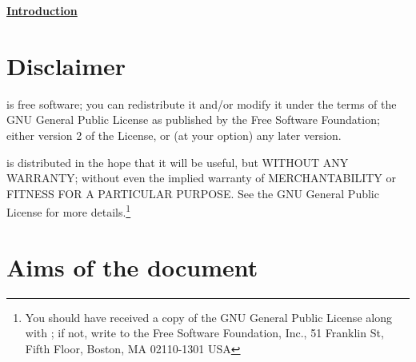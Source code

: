 
%
%
%
%


\begin{center}
\underline{{\Huge \textbf{Introduction}}}
\end{center}

\vspace{1cm}

\section*{Disclaimer}
\CS is free software; you can redistribute it
and/or modify it under the terms of the GNU General Public License
as published by the Free Software Foundation; either version 2 of
the License, or (at your option) any later version.

\CS is distributed in the hope that it will be
useful, but WITHOUT ANY WARRANTY; without even the implied warranty
of MERCHANTABILITY or FITNESS FOR A PARTICULAR PURPOSE.  See the
GNU General Public License for more details.\footnote{You should have
received a copy of the GNU General Public License
along with \CS; if not, write to the
Free Software Foundation, Inc.,
51 Franklin St, Fifth Floor,
Boston, MA  02110-1301  USA}

\section*{Aims of the document}

